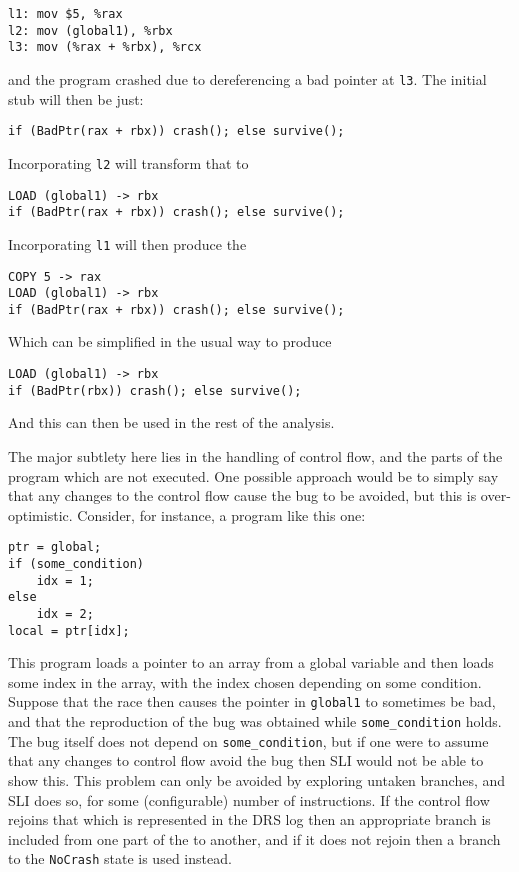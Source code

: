 \begin{verbatim}
l1: mov $5, %rax
l2: mov (global1), %rbx
l3: mov (%rax + %rbx), %rcx
\end{verbatim}

and the program crashed due to dereferencing a bad pointer at \verb|l3|.
The initial stub \StateMachine will then be just:

\begin{verbatim}
if (BadPtr(rax + rbx)) crash(); else survive();
\end{verbatim}

Incorporating \verb|l2| will transform that to

\begin{verbatim}
LOAD (global1) -> rbx
if (BadPtr(rax + rbx)) crash(); else survive();
\end{verbatim}

Incorporating \verb|l1| will then produce the \StateMachine

\begin{verbatim}
COPY 5 -> rax
LOAD (global1) -> rbx
if (BadPtr(rax + rbx)) crash(); else survive();
\end{verbatim}

Which can be simplified in the usual way to produce

\begin{verbatim}
LOAD (global1) -> rbx
if (BadPtr(rbx)) crash(); else survive();
\end{verbatim}

And this can then be used in the rest of the analysis.

The major subtlety here lies in the handling of control flow, and the parts of the program which are not executed.
One possible approach would be to simply say that any changes to the control flow cause the bug to be avoided, but this is over-optimistic.
Consider, for instance, a program like this one:

\begin{verbatim}
ptr = global;
if (some_condition)
    idx = 1;
else
    idx = 2;
local = ptr[idx];
\end{verbatim}

This program loads a pointer to an array from a global variable and then loads some index in the array, with the index chosen depending on some condition.
Suppose that the race then causes the pointer in \verb|global1| to sometimes be bad, and that the reproduction of the bug was obtained while \verb|some_condition| holds.
The bug itself does not depend on \verb|some_condition|, but if one were to assume that any changes to control flow avoid the bug then SLI would not be able to show this.
This problem can only be avoided by exploring untaken branches, and SLI does so, for some (configurable) number of instructions.
If the control flow rejoins that which is represented in the DRS log then an appropriate branch is included from one part of the \StateMachine to another, and if it does not rejoin then a branch to the \verb|NoCrash| state is used instead.

